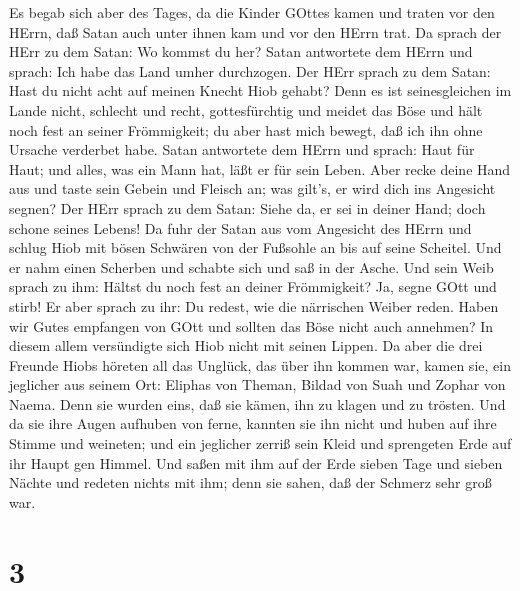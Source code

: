  Es begab sich aber des Tages, da die Kinder GOttes kamen
und traten vor den HErrn, daß Satan auch unter ihnen kam und vor den
HErrn trat.  Da sprach der HErr zu dem Satan: Wo kommst du
her? Satan antwortete dem HErrn und sprach: Ich habe das Land umher
durchzogen.  Der HErr sprach zu dem Satan: Hast du nicht
acht auf meinen Knecht Hiob gehabt? Denn es ist seinesgleichen im Lande
nicht, schlecht und recht, gottesfürchtig und meidet das Böse und hält
noch fest an seiner Frömmigkeit; du aber hast mich bewegt, daß ich ihn
ohne Ursache verderbet habe.  Satan antwortete dem HErrn und
sprach: Haut für Haut; und alles, was ein Mann hat, läßt er für sein
Leben.  Aber recke deine Hand aus und taste sein Gebein und
Fleisch an; was gilt's, er wird dich ins Angesicht segnen? 
Der HErr sprach zu dem Satan: Siehe da, er sei in deiner Hand; doch
schone seines Lebens!  Da fuhr der Satan aus vom Angesicht
des HErrn und schlug Hiob mit bösen Schwären von der Fußsohle an bis auf
seine Scheitel.  Und er nahm einen Scherben und schabte sich
und saß in der Asche.  Und sein Weib sprach zu ihm: Hältst
du noch fest an deiner Frömmigkeit? Ja, segne GOtt und stirb!
 Er aber sprach zu ihr: Du redest, wie die närrischen
Weiber reden. Haben wir Gutes empfangen von GOtt und sollten das Böse
nicht auch annehmen? In diesem allem versündigte sich Hiob nicht mit
seinen Lippen.  Da aber die drei Freunde Hiobs höreten all
das Unglück, das über ihn kommen war, kamen sie, ein jeglicher aus
seinem Ort: Eliphas von Theman, Bildad von Suah und Zophar von Naema.
Denn sie wurden eins, daß sie kämen, ihn zu klagen und zu trösten.
 Und da sie ihre Augen aufhuben von ferne, kannten sie ihn
nicht und huben auf ihre Stimme und weineten; und ein jeglicher zerriß
sein Kleid und sprengeten Erde auf ihr Haupt gen Himmel. 
Und saßen mit ihm auf der Erde sieben Tage und sieben Nächte und redeten
nichts mit ihm; denn sie sahen, daß der Schmerz sehr groß war.

\hypertarget{section-2}{%
\section{3}\label{section-2}}

